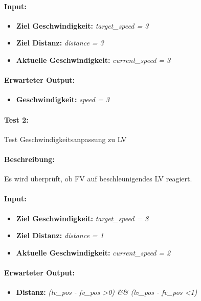 \documentclass[a4paper, 12pt, titlepage]{scrartcl}
\begin{document}
			\paragraph{Input:}
			\begin{itemize} \itemsep-0.5em
				\item \textbf{Ziel Geschwindigkeit:} \emph{target\_speed = 3}
				\item \textbf{Ziel Distanz:} \emph{distance = 3}
				\item \textbf{Aktuelle Geschwindigkeit:} \emph{current\_speed = 3}
			\end{itemize}
			\paragraph{Erwarteter Output:}
			\begin{itemize} \itemsep-0.5em
				\item \textbf{Geschwindigkeit:} \emph{speed = 3}
			\end{itemize}
			\paragraph{Test 2:}{Test Geschwindigkeitsanpassung zu LV}
			\paragraph{Beschreibung:} Es wird überprüft, ob FV auf beschleunigendes LV reagiert.
			\paragraph{Input:}
			\begin{itemize} \itemsep-0.5em
				\item \textbf{Ziel Geschwindigkeit:} \emph{target\_speed = 8}
				\item \textbf{Ziel Distanz:} \emph{distance = 1}
				\item \textbf{Aktuelle Geschwindigkeit:} \emph{current\_speed = 2}
			\end{itemize}
			\paragraph{Erwarteter Output:}
			\begin{itemize} \itemsep-0.5em
				\item \textbf{Distanz:} \emph{(lv\_pos - fv\_pos \textgreater 0) \&\& (lv\_pos - fv\_pos \textless 1)}
			\end{itemize}
\end{document}
